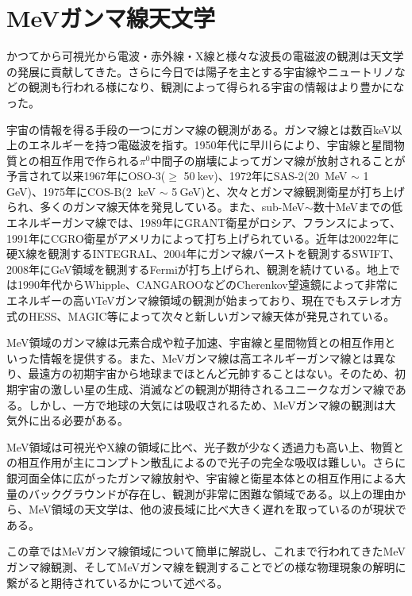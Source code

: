 \chapter{MeVガンマ線天文学}
かつてから可視光から電波・赤外線・X線と様々な波長の電磁波の観測は天文学の発展に貢献してきた。さらに今日では陽子を主とする宇宙線やニュートリノなどの観測も行われる様になり、観測によって得られる宇宙の情報はより豊かになった。

宇宙の情報を得る手段の一つにガンマ線の観測がある。ガンマ線とは数百keV以上のエネルギーを持つ電磁波を指す。1950年代に早川らにより、宇宙線と星間物質との相互作用で作られる$\pi^{0}$中間子の崩壊によってガンマ線が放射されることが予言されて以来1967年にOSO-3($\geq$ 50$\ $kev)、1972年にSAS-2(20\ MeV $\sim$ 1$\ $GeV)、1975年にCOS-B(2 $\ $keV $\sim$ 5$\ $GeV)と、次々とガンマ線観測衛星が打ち上げられ、多くのガンマ線天体を発見している。また、sub-MeV$\sim$数十MeVまでの低エネルギーガンマ線では、1989年にGRANT衛星がロシア、フランスによって、1991年にCGRO衛星がアメリカによって打ち上げられている。近年は20022年に硬X線を観測するINTEGRAL、2004年にガンマ線バーストを観測するSWIFT、2008年にGeV領域を観測するFermiが打ち上げられ、観測を続けている。地上では1990年代からWhipple、CANGAROOなどのCherenkov望遠鏡によって非常にエネルギーの高いTeVガンマ線領域の観測が始まっており、現在でもステレオ方式のHESS、MAGIC等によって次々と新しいガンマ線天体が発見されている。

MeV領域のガンマ線は元素合成や粒子加速、宇宙線と星間物質との相互作用といった情報を提供する。また、MeVガンマ線は高エネルギーガンマ線とは異なり、最遠方の初期宇宙から地球までほとんど元帥することはない。そのため、初期宇宙の激しい星の生成、消滅などの観測が期待されるユニークなガンマ線である。しかし、一方で地球の大気には吸収されるため、MeVガンマ線の観測は大気外に出る必要がある。

MeV領域は可視光やX線の領域に比べ、光子数が少なく透過力も高い上、物質との相互作用が主にコンプトン散乱によるので光子の完全な吸収は難しい。さらに銀河面全体に広がったガンマ線放射や、宇宙線と衛星本体との相互作用による大量のバックグラウンドが存在し、観測が非常に困難な領域である。以上の理由から、MeV領域の天文学は、他の波長域に比べ大きく遅れを取っているのが現状である。

この章ではMeVガンマ線領域について簡単に解説し、これまで行われてきたMeVガンマ線観測、そしてMeVガンマ線を観測することでどの様な物理現象の解明に繋がると期待されているかについて述べる。

